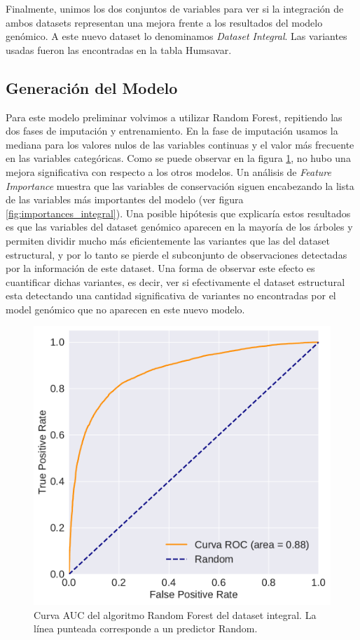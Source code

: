 Finalmente, unimos los dos conjuntos de variables para ver si la integración de ambos datasets representan una mejora frente a los resultados del modelo genómico. A este nuevo dataset lo denominamos \textit{Dataset Integral}. Las variantes usadas fueron las encontradas en la tabla Humsavar. 

\subsection{Generación del Modelo}

Para este modelo preliminar volvimos a utilizar Random Forest, repitiendo las dos fases de imputación y entrenamiento. En la fase de imputación usamos la mediana para los valores nulos de las variables continuas y el valor más frecuente en las variables categóricas. Como se puede observar en la figura \ref{fig:auc_integral}, no hubo una mejora significativa con respecto a los otros modelos. Un análisis de \textit{Feature Importance} muestra que las variables de conservación siguen encabezando la lista de las variables más importantes del modelo (ver figura \ref{fig:importances_integral}). Una posible hipótesis que explicaría estos resultados es que las variables del dataset genómico aparecen en la mayoría de los árboles y permiten dividir mucho más eficientemente las variantes que las del dataset estructural, y por lo tanto se pierde el subconjunto de observaciones detectadas por la información de este dataset. Una forma de observar este efecto es cuantificar dichas variantes, es decir, ver si efectivamente el dataset estructural esta detectando una cantidad significativa de variantes no encontradas por el model genómico que no aparecen en este nuevo modelo. 

\begin{figure}[H]
    \centering
    \includegraphics[scale=0.55]{documents/latex/figures/3/auc_integral.pdf}
    \caption{Curva AUC del algoritmo Random Forest del dataset integral. La línea punteada corresponde a un predictor Random.}
    \label{fig:auc_integral}
\end{figure}

